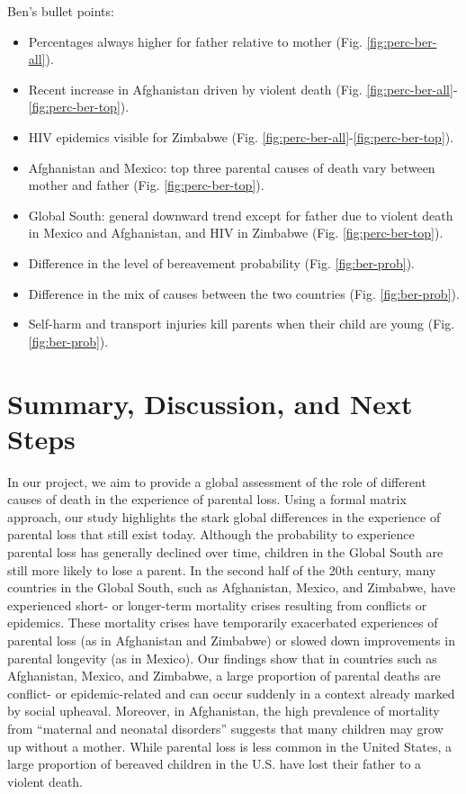 \documentclass[
  11pt,
  letterpaper,
]{article}
\begin{document}
Ben's bullet points:

\begin{itemize}
\item
  Percentages always higher for father relative to mother (Fig. \ref{fig:perc-ber-all}).
\item
  Recent increase in Afghanistan driven by violent death (Fig. \ref{fig:perc-ber-all}-\ref{fig:perc-ber-top}).
\item
  HIV epidemics visible for Zimbabwe (Fig. \ref{fig:perc-ber-all}-\ref{fig:perc-ber-top}).
\item
  Afghanistan and Mexico: top three parental causes of death vary between mother and father (Fig. \ref{fig:perc-ber-top}).
\item
  Global South: general downward trend except for father due to violent death in Mexico and Afghanistan, and HIV in Zimbabwe (Fig. \ref{fig:perc-ber-top}).
\item
  Difference in the level of bereavement probability (Fig. \ref{fig:ber-prob}).
\item
  Difference in the mix of causes between the two countries (Fig. \ref{fig:ber-prob}).
\item
  Self-harm and transport injuries kill parents when their child are young (Fig. \ref{fig:ber-prob}).
\end{itemize}

\hypertarget{summary-discussion-and-next-steps}{%
\section{Summary, Discussion, and Next Steps}\label{summary-discussion-and-next-steps}}

In our project, we aim to provide a global assessment of the role of different causes of death in the experience of parental loss. Using a formal matrix approach, our study highlights the stark global differences in the experience of parental loss that still exist today. Although the probability to experience parental loss has generally declined over time, children in the Global South are still more likely to lose a parent. In the second half of the 20th century, many countries in the Global South, such as Afghanistan, Mexico, and Zimbabwe, have experienced short- or longer-term mortality crises resulting from conflicts or epidemics. These mortality crises have temporarily exacerbated experiences of parental loss (as in Afghanistan and Zimbabwe) or slowed down improvements in parental longevity (as in Mexico). Our findings show that in countries such as Afghanistan, Mexico, and Zimbabwe, a large proportion of parental deaths are conflict- or epidemic-related and can occur suddenly in a context already marked by social upheaval. Moreover, in Afghanistan, the high prevalence of mortality from ``maternal and neonatal disorders'' suggests that many children may grow up without a mother. While parental loss is less common in the United States, a large proportion of bereaved children in the U.S. have lost their father to a violent death.
\end{document}
